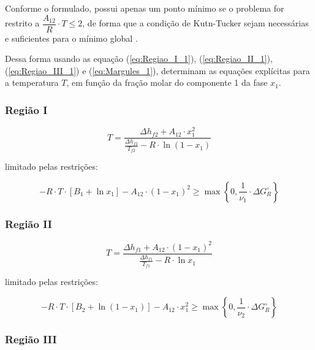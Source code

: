 Conforme o formulado, possui apenas um ponto mínimo se o problema for restrito a $\dfrac{A_{12}}{R}\cdot T\leq2$, de forma que a condição de Kutn-Tucker sejam necessárias e suficientes para o mínimo global \cite{Edgar2001}.

Dessa forma usando as equação (\ref{eq:Regiao_I_1}), (\ref{eq:Regiao_II_1}), (\ref{eq:Regiao_III_1}) e (\ref{eq:Margules_1}), determinam as equações explícitas para a temperatura $T$, em função da fração molar do componente 1 da fase $x_ 1$.

\subsubsection{Região I}

\begin{equation}
T=\frac{\Delta h_{f2}+A_{12}\cdot x_{1}^{2}}{\frac{\Delta h_{f2}}{T_{f2}} -R\cdot\ln(1-x_{1})}
\label{equa_5}
\end{equation}

limitado pelas restrições:

\begin{equation}
-R\cdot T\cdot[B_{1}+\ln x_{1}]-A_{12}\cdot(1-x_{1})^{2}\geq\max\left\{0,\frac{1}{\nu_1}\cdot\Delta G_{R}^{\circ} \right\}
\label{limite_5}
\end{equation}

\subsubsection{Região II}

\begin{equation}
T=\frac{\Delta h_{f1}+A_{12}\cdot (1-x_{1})^{2}}{\frac{\Delta h_{f1}}{T_{f1}} -R\cdot\ln x_{1}}
\label{equa_6}
\end{equation}

limitado pelas restrições:

\begin{equation}
-R\cdot T\cdot[B_{2}+\ln (1-x_{1})]-A_{12}\cdot x_{1}^{2}\geq\max\left\{0,\frac{1}{\nu_2}\cdot\Delta G_{R}^{\circ} \right\}
\label{limite_6}
\end{equation}

\subsubsection{Região III}

